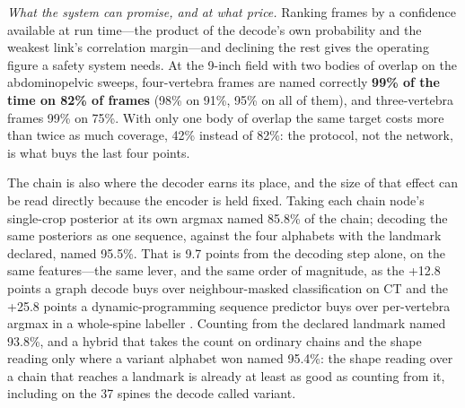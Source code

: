 \documentclass[11pt,letterpaper]{article}
\begin{document}
\emph{What the system can promise, and at what price.} Ranking frames by a confidence available at run time---the product of the decode's own probability and the weakest link's correlation margin---and declining the rest gives the operating figure a safety system needs. At the 9-inch field with two bodies of overlap on the abdominopelvic sweeps, four-vertebra frames are named correctly \textbf{99\% of the time on 82\% of frames} (98\% on 91\%, 95\% on all of them), and three-vertebra frames 99\% on 75\%. With only one body of overlap the same target costs more than twice as much coverage, 42\% instead of 82\%: the protocol, not the network, is what buys the last four points.

The chain is also where the decoder earns its place, and the size of that effect can be read directly because the encoder is held fixed. Taking each chain node's single-crop posterior at its own argmax named 85.8\% of the chain; decoding the same posteriors as one sequence, against the four alphabets with the landmark declared, named 95.5\%. That is 9.7 points from the decoding step alone, on the same features---the same lever, and the same order of magnitude, as the +12.8 points a graph decode buys over neighbour-masked classification on CT \citep{meng2023} and the +25.8 points a dynamic-programming sequence predictor buys over per-vertebra argmax in a whole-spine labeller \citep{veridah2026}. Counting from the declared landmark named 93.8\%, and a hybrid that takes the count on ordinary chains and the shape reading only where a variant alphabet won named 95.4\%: the shape reading over a chain that reaches a landmark is already at least as good as counting from it, including on the 37 spines the decode called variant.
\end{document}
